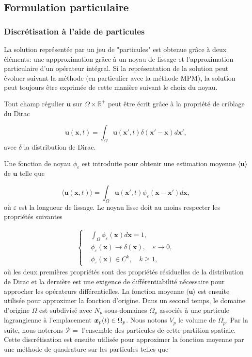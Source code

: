 \subsection{Formulation particulaire}

\subsubsection{Discrétisation à l'aide de particules}

La solution représentée par un jeu de "particules" est obtenue grâce à deux éléments: une appproximation grâce à un noyau de lissage et l'approximation particulaire d'un opérateur intégral. Si la représentation de la solution peut évoluer suivant la méthode (en particulier avec la méthode MPM), la solution peut toujours être exprimée de cette manière suivant le choix du noyau.

Tout champ régulier $\bm{u}$ sur $\Omega \times \mathbb R^+$ peut être écrit grâce à la propriété de criblage du Dirac

\begin{equation*}
    \bm{u}(\bm{x}, t) = \int_{\Omega} \bm{u}(\bm{x}', t) \delta(\bm{x}' - \bm{x})  d\bm{x}',
\end{equation*}avec $\delta$ la distribution de Dirac.

Une fonction de noyau $\phi_\varepsilon$ est introduite pour obtenir une estimation moyenne $\langle \bm{u} \rangle$ de $\bm{u}$ telle que

\begin{equation*}
    \langle \bm{u}(\bm{x}, t) \rangle = \int_{\Omega} \bm{u}(\bm{x}', t) \phi_\varepsilon(\bm{x}-\bm{x}') d\bm{x},
\end{equation*}où $\varepsilon$ est la longueur de lissage. Le noyau lisse doit au moins respecter les propriétés suivantes

\begin{gather*}
    \left\{\begin{aligned}
         & \int_{\Omega} \phi_\varepsilon(\bm{x}) d\bm{x} = 1,                  \\
         & \phi_\varepsilon(\bm{x}) \to \delta(\bm x), \quad \varepsilon \to 0, \\
         & \phi_\varepsilon(\bm{x}) \in C^k,  \quad k \geq 1,
    \end{aligned} \right.
\end{gather*}où les deux premières propriétés sont des propriétés résiduelles de la distribution de Dirac et la dernière est une exigence de différentiabilité nécessaire pour approcher les opérateurs différentielles. La fonction moyenne $\langle \bm{u} \rangle$ est ensuite utilisée pour approximer la fonction d'origine. Dans un second temps, le domaine d'origine $\Omega$ est subdivisé avec $N_p$ sous-domaines $\Omega_p$ associés à une particule lagrangienne à l'emplacement $\bm{x}_p(t) \in \Omega_p$. Nous notons $V_p$ le volume de $\Omega_p$. Par la suite, nous noterons $\mathcal P = $ l'ensemble des particules de cette partition spatiale. Cette discrétisation est ensuite utilisée pour approximer la fonction moyenne par une méthode de quadrature sur les particules telles que

